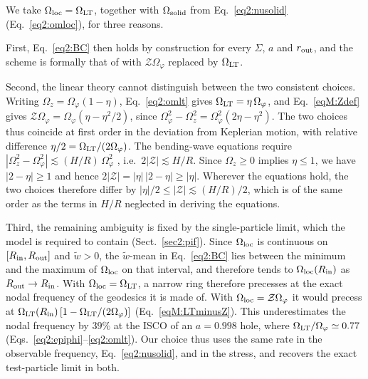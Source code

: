 We take $\Omega_\textup{loc}=\Omega_\textup{LT}$, together with $\Omega_\textup{solid}$ from Eq.~\eqref{eq2:nusolid} (Eq.~\ref{eq2:omloc}), for three reasons.

First, Eq.~\eqref{eq2:BC} then holds by construction for every $\Sigma$, $a$ and $r_\textup{out}$, and the scheme is formally that of \citet{FoucartLai2014} with $\mathcal{Z}\Omega_\varphi$ replaced by $\Omega_\textup{LT}$.

Second, the linear theory cannot distinguish between the two consistent choices.
Writing $\Omega_z=\Omega_\varphi(1-\eta)$, Eq.~\eqref{eq2:omlt} gives $\Omega_\textup{LT}=\eta\,\Omega_\varphi$, and Eq.~\eqref{eqM:Zdef} gives $\mathcal{Z}\Omega_\varphi=\Omega_\varphi(\eta-\eta^2/2)$, since $\Omega_\varphi^2-\Omega_z^2=\Omega_\varphi^2(2\eta-\eta^2)$.
The two choices thus coincide at first order in the deviation from Keplerian motion, with relative difference $\eta/2=\Omega_\textup{LT}/(2\Omega_\varphi)$.
The bending-wave equations require $|\Omega_z^2-\Omega_\varphi^2|\lesssim(H/R)\,\Omega_\varphi^2$ \citep{FoucartLai2014}, i.e.\ $2|\mathcal{Z}|\lesssim H/R$.
Since $\Omega_z\geq0$ implies $\eta\leq1$, we have $|2-\eta|\geq1$ and hence $2|\mathcal{Z}|=|\eta|\,|2-\eta|\geq|\eta|$.
Wherever the equations hold, the two choices therefore differ by $|\eta|/2\leq|\mathcal{Z}|\lesssim(H/R)/2$, which is of the same order as the terms in $H/R$ neglected in deriving the equations.

Third, the remaining ambiguity is fixed by the single-particle limit, which the model is required to contain (Sect.~\ref{sec2:pif}).
Since $\Omega_\textup{loc}$ is continuous on $[R_\textup{in},R_\textup{out}]$ and $\tilde w>0$, the $\tilde w$-mean in Eq.~\eqref{eq2:BC} lies between the minimum and the maximum of $\Omega_\textup{loc}$ on that interval, and therefore tends to $\Omega_\textup{loc}(R_\textup{in})$ as $R_\textup{out}\to R_\textup{in}$.
With $\Omega_\textup{loc}=\Omega_\textup{LT}$, a narrow ring therefore precesses at the exact nodal frequency of the geodesics it is made of.
With $\Omega_\textup{loc}=\mathcal{Z}\Omega_\varphi$ it would precess at $\Omega_\textup{LT}(R_\textup{in})\left[1-\Omega_\textup{LT}/(2\Omega_\varphi)\right]$ (Eq.~\ref{eqM:LTminusZ}).
This underestimates the nodal frequency by $39\%$ at the ISCO of an $a=0.998$ hole, where $\Omega_\textup{LT}/\Omega_\varphi\simeq0.77$ (Eqs.~\ref{eq2:epiphi}--\ref{eq2:omlt}).
Our choice thus uses the same rate in the observable frequency, Eq.~\eqref{eq2:nusolid}, and in the stress, and recovers the exact test-particle limit in both.

